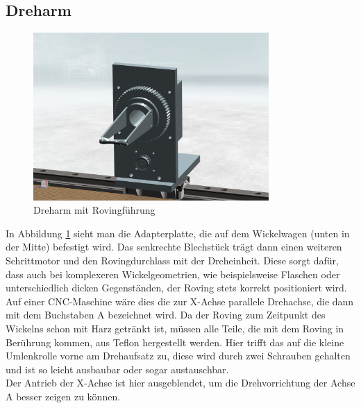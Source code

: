 \documentclass[paper=A4,pagesize,DIV=18, 12pt,listof=totoc,bibliography=totoc,headings=optiontohead,open=any]{article}
\begin{document}
\subsection{Dreharm}
\begin{figure}
	\centering
	\includegraphics[width=0.8\textwidth]{NX_Screenshots/arm_vorne.png}
	\caption{Dreharm mit Rovingführung} 
	\label{fig:dreharm}
\end{figure}
In Abbildung \ref{fig:dreharm} sieht man die Adapterplatte, die auf dem Wickelwagen (unten in der Mitte) befestigt wird. Das senkrechte Blechstück trägt dann einen weiteren Schrittmotor und den Rovingdurchlass mit der Dreheinheit. Diese sorgt dafür, dass auch bei komplexeren Wickelgeometrien, wie beispielsweise Flaschen oder unterschiedlich dicken Gegenständen, der Roving stets korrekt positioniert wird. Auf einer CNC-Maschine wäre dies die zur X-Achse parallele Drehachse, die dann mit dem Buchstaben A bezeichnet wird. Da der Roving zum Zeitpunkt des Wickelns schon mit Harz getränkt ist, müssen alle Teile, die mit dem Roving in Berührung kommen, aus Teflon hergestellt werden. Hier trifft das auf die kleine Umlenkrolle vorne am Drehaufsatz zu, diese wird durch zwei Schrauben gehalten und ist so leicht ausbaubar oder sogar austauschbar.\\
Der Antrieb der X-Achse ist hier ausgeblendet, um die Drehvorrichtung der Achse A besser zeigen zu können.
\end{document}
